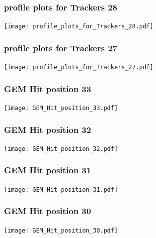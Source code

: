 \documentclass[slidestop,compress,mathserif]{beamer}
\begin{document}
\begin{frame}\frametitle{profile plots for Trackers 28}
	 \texttt{[image: profile\_plots\_for\_Trackers\_28.pdf]}
\end{frame}
\begin{frame}\frametitle{profile plots for Trackers 27}
	 \texttt{[image: profile\_plots\_for\_Trackers\_27.pdf]}
\end{frame}
\begin{frame}\frametitle{GEM Hit position 33}
	 \texttt{[image: GEM\_Hit\_position\_33.pdf]}
\end{frame}
\begin{frame}\frametitle{GEM Hit position 32}
	 \texttt{[image: GEM\_Hit\_position\_32.pdf]}
\end{frame}
\begin{frame}\frametitle{GEM Hit position 31}
	 \texttt{[image: GEM\_Hit\_position\_31.pdf]}
\end{frame}
\begin{frame}\frametitle{GEM Hit position 30}
	 \texttt{[image: GEM\_Hit\_position\_30.pdf]}
\end{frame}
\end{document}

